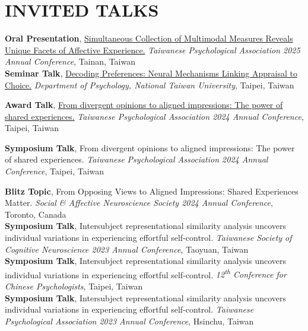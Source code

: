 \documentclass[a4paper,12pt]{article}
\newcommand{\itemspace}{7pt} %
\begin{document}
\section*{INVITED TALKS}
\textbf{Oral Presentation}, \href{https://drive.google.com/file/d/1gzteA8rduKYrEWR7e6y21c19jAAKienE/view?pli=1}{Simultaneous Collection of Multimodal Measures Reveals Unique Facets of Affective Experience.} \textit{Taiwanese Psychological Association 2025 Annual Conference}, Tainan, Taiwan \\[\itemspace]
\textbf{Seminar Talk}, \href{http://www.psy.ntu.edu.tw/index.php/homepage/speech/2903-1131127}{Decoding Preferences: Neural Mechanisms Linking Appraisal to Choice.} \textit{Department of Psychology, National Taiwan University}, Taipei, Taiwan \\[\itemspace]
\noindent\begin{minipage}{\textwidth}
\textbf{Award Talk}, \href{https://github.com/Ben-FCC/Ben-FCC_CV/blob/main/assets/2024_TPA_Oral.pdf}{From divergent opinions to aligned impressions: The power of shared experiences.}  \textit{Taiwanese Psychological Association 2024 Annual Conference}, Taipei, Taiwan
\end{minipage}
\par\vspace{\itemspace}
\noindent\begin{minipage}{\textwidth}
\textbf{Symposium Talk}, From divergent opinions to aligned impressions: The power of shared experiences. \textit{Taiwanese Psychological Association 2024 Annual Conference}, Taipei, Taiwan
\end{minipage}
\par\vspace{\itemspace}
\noindent\textbf{Blitz Topic}, From Opposing Views to Aligned Impressions: Shared Experiences Matter. \textit{Social \& Affective Neuroscience Society 2024 Annual Conference}, Toronto, Canada \\[\itemspace]
\textbf{Symposium Talk}, Intersubject representational similarity analysis uncovers individual variations in experiencing effortful self-control. \textit{Taiwanese Society of Cognitive Neuroscience 2023 Annual Conference}, Taoyuan, Taiwan \\[\itemspace]
\textbf{Symposium Talk}, Intersubject representational similarity analysis uncovers individual variations in experiencing effortful self-control.  \textit{12\textsuperscript{th} Conference for Chinese Psychologists}, Taipei, Taiwan \\[\itemspace]
\textbf{Symposium Talk}, Intersubject representational similarity analysis uncovers individual variations in experiencing effortful self-control.  \textit{Taiwanese Psychological Association 2023 Annual Conference}, Hsinchu, Taiwan \\[\itemspace]
\end{document}
